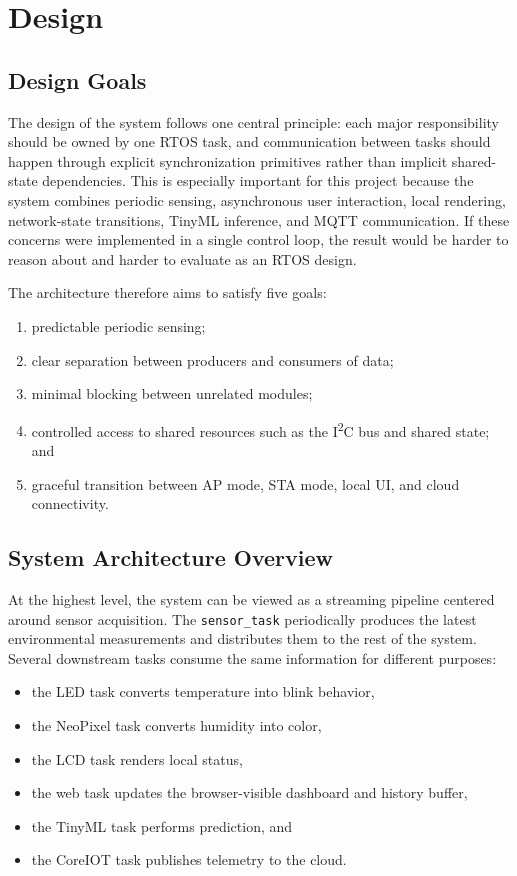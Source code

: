 \section{Design}

\subsection{Design Goals}
The design of the system follows one central principle: each major responsibility
should be owned by one RTOS task, and communication between tasks should happen
through explicit synchronization primitives rather than implicit shared-state
dependencies. This is especially important for this project because the system
combines periodic sensing, asynchronous user interaction, local rendering,
network-state transitions, TinyML inference, and MQTT communication. If these
concerns were implemented in a single control loop, the result would be harder
to reason about and harder to evaluate as an RTOS design.

The architecture therefore aims to satisfy five goals:
\begin{enumerate}
  \item predictable periodic sensing;
  \item clear separation between producers and consumers of data;
  \item minimal blocking between unrelated modules;
  \item controlled access to shared resources such as the I\textsuperscript{2}C
  bus and shared state; and
  \item graceful transition between AP mode, STA mode, local UI, and cloud
  connectivity.
\end{enumerate}

\subsection{System Architecture Overview}
At the highest level, the system can be viewed as a streaming pipeline centered
around sensor acquisition. The \texttt{sensor\_task} periodically produces the
latest environmental measurements and distributes them to the rest of the
system. Several downstream tasks consume the same information for different
purposes:
\begin{itemize}
  \item the LED task converts temperature into blink behavior,
  \item the NeoPixel task converts humidity into color,
  \item the LCD task renders local status,
  \item the web task updates the browser-visible dashboard and history buffer,
  \item the TinyML task performs prediction, and
  \item the CoreIOT task publishes telemetry to the cloud.
\end{itemize}

